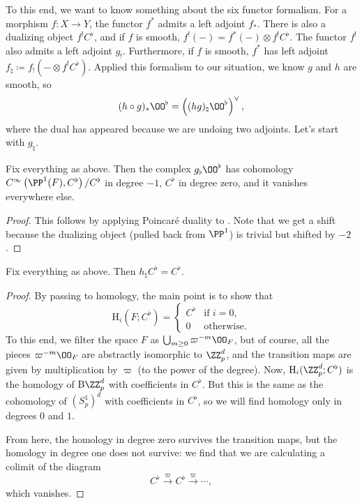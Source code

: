 \documentclass[../notes.tex]{subfiles}
\begin{document}
To this end, we want to know something about the six functor formalism. For a morphism $f\colon X\to Y$, the functor $f^*$ admits a left adjoint $f_*$. There is also a dualizing object $f^!C^\flat$, and if $f$ is smooth, $f^!(-)=f^*(-)\otimes f^!C^\flat$. The functor $f^!$ also admits a left adjoint $g_!$. Furthermore, if $f$ is smooth, $f^*$ has left adjoint $f_\natural\coloneqq f_!\left(-\otimes f^!C^\flat\right)$. Applied this formalism to our situation, we know $g$ and $h$ are smooth, so
\[(h\circ g)_*\OO^\flat=\left((hg)_\natural\OO^\flat\right)^\lor,\]
where the dual has appeared because we are undoing two adjoints. Let's start with $g_\natural$.
\begin{lemma}
	Fix everything as above. Then the complex $g_\flat\OO^\flat$ has cohomology $C^\infty\left(\PP^1(F),C^\flat\right)/C^\flat$ in degree $-1$, $C^\flat$ in degree zero, and it vanishes everywhere else.
\end{lemma}
\begin{proof}
	This follows by applying Poincar\'e duality to . Note that we get a shift because the dualizing object (pulled back from $\PP^1$) is trivial but shifted by $-2$.
\end{proof}
\begin{lemma}
	Fix everything as above. Then $h_\natural C^\flat=C^\flat$.
\end{lemma}
\begin{proof}
	By passing to homology, the main point is to show that
	\[\mathrm H_i(F;C^\flat)=\begin{cases}
		C^\flat & \text{if }i=0, \\
		0 & \text{otherwise}.
	\end{cases}\]
	To this end, we filter the space $F$ as $\bigcup_{m\ge0}\varpi^{-m}\OO_F$, but of course, all the pieces $\varpi^{-m}\OO_F$ are abstractly isomorphic to $\ZZ_p^d$, and the transition maps are given by multiplication by $\varpi$ (to the power of the degree). Now, $\mathrm H_i(\ZZ_p^d;C^\flat)$ is the homology of $\mathrm B\ZZ_p^{d}$ with coefficients in $C^\flat$. But this is the same as the cohomology of $\left(S^1_p\right)^{d}$ with coefficients in $C^\flat$, so we will find homology only in degrees $0$ and $1$.
	
	From here, the homology in degree zero survives the transition maps, but the homology in degree one does not survive: we find that we are calculating a colimit of the diagram
	\[C^\flat\stackrel\varpi\to C^\flat\stackrel\varpi\to\cdots,\]
	which vanishes.
\end{proof}
\end{document}
